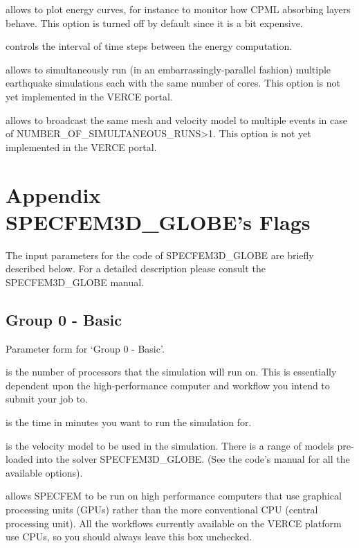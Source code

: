\documentclass[english]{book}
\begin{document}
 allows to plot energy curves, for instance to monitor
how CPML absorbing layers behave. This option is turned off by default
since it is a bit expensive.

 controls the interval of time steps
between the energy computation.

 allows to simultaneously run (in an
embarrassingly-parallel fashion) multiple earthquake simulations each
with the same number of cores. This option is not yet implemented in the
VERCE portal.

 allows to broadcast the same mesh
and velocity model to multiple events in case of
NUMBER\_OF\_SIMULTANEOUS\_RUNS\textgreater{}1. This option is not yet implemented in
the VERCE portal.


\chapter{Appendix \textendash{} SPECFEM3D\_GLOBE’s Flags}
\label{\detokenize{Appendix2:appendix-2-specfem3d-globes-flags}}\label{\detokenize{Appendix2::doc}}
The input parameters for the code of SPECFEM3D\_GLOBE are briefly
described below. For a detailed description please consult the
SPECFEM3D\_GLOBE manual.


\section{Group 0 - Basic}
\label{\detokenize{Appendix2:a2-1-group-0-basic}}

 Parameter form for ‘Group 0 - Basic’.

 is the number of processors that the simulation will run on.
This is essentially dependent upon the high-performance computer and
workflow you intend to submit your job to.

 is the time in minutes you want to run
the simulation for.

 is the velocity model to be used in the simulation. There is a
range of models pre-loaded into the solver SPECFEM3D\_GLOBE. (See the
code’s manual for all the available options).

 allows SPECFEM to be run on high performance computers
that use graphical processing units (GPUs) rather than the more
conventional CPU (central processing unit). All the workflows currently
available on the VERCE platform use CPUs, so you should always leave
this box unchecked.
\end{document}
